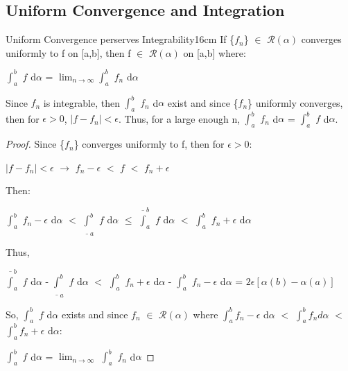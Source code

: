 \subsection[ Integration ]{ Uniform Convergence and Integration }

    \begin{wtheorem}{Uniform Convergence perserves Integrability}{16cm}
        If \{$f_n$\} $\in$ $\mathscr{R}(\alpha)$ converges uniformly to f on [a,b],
        then f $\in$ $\mathscr{R}(\alpha)$ on [a,b] where:

        \hspace{0.5cm}
        $\int_a^b$ $f$ d$\alpha$
        = $\lim_{n \rightarrow \infty} \int_a^b$ $f_n$ d$\alpha$        
    \end{wtheorem}

    \begin{intuition}
        Since $f_n$ is integrable, then $\int_a^b$ $f_n$ d$\alpha$ exist
        and since \{$f_n$\} uniformly converges, then for $\epsilon > 0$,
        $|f - f_n| < \epsilon$.
        Thus, for a large enough n,
        $\int_a^b$ $f_n$ d$\alpha$ = $\int_a^b$ $f$ d$\alpha$.
    \end{intuition}

    \vspace{0.1cm}

    \begin{proof}
        Since \{$f_n$\} converges uniformly to f, then for $\epsilon > 0$:

        \hspace{0.5cm}
        $|f - f_n| < \epsilon$
        \hspace{1cm}
        $\rightarrow$
        \hspace{1cm}
        $f_n - \epsilon$ $<$ $f$ $<$ $f_n + \epsilon$

        Then:

        \hspace{0.5cm}
        $\int_{a}^{b}$ $f_n - \epsilon$ d$\alpha$
        $<$ $\underline{\int}_{a}^{b}$ $f$ d$\alpha$
        $\leq$ $\overline{\int}_{a}^{b}$ $f$ d$\alpha$
        $<$ $\int_{a}^{b}$ $f_n + \epsilon$ d$\alpha$

        Thus,

        \hspace{0.5cm}
        $\overline{\int}_{a}^{b}$ $f$ d$\alpha$
            - $\underline{\int}_{a}^{b}$ $f$ d$\alpha$
        $<$ $\int_{a}^{b}$ $f_n + \epsilon$ d$\alpha$
            - $\int_{a}^{b}$ $f_n - \epsilon$ d$\alpha$
        = $2\epsilon[\alpha(b) - \alpha(a)]$

        So, $\int_a^b$ $f$ d$\alpha$ exists and since
        $f_n$ $\in$ $\mathscr{R}(\alpha)$ where 
        $\int_{a}^{b} f_n - \epsilon$ d$\alpha$
        $<$ $\int_{a}^{b} f_n d\alpha$
        $<$ $\int_{a}^{b} f_n + \epsilon$ d$\alpha$:

        \hspace{0.5cm}
        $\int_{a}^{b}$ $f$ d$\alpha$
        = $\lim_{n \rightarrow \infty}$ $\int_{a}^{b}$ $f_n$ d$\alpha$
    \end{proof}

